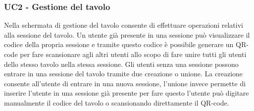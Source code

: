 \subsubsection{UC2 - Gestione del tavolo}
Nella schermata di gestione del tavolo consente di effettuare operazioni relativi alla sessione del tavolo. Un utente già presente in una sessione può visualizzare il codice della propria sessione e tramite questo codice è possibile generare un QR-code per fare scansionare agli altri utenti allo scopo di fare unire tutti gli utenti dello stesso tavolo nella stessa sessione. Gli utenti senza una sessione possono entrare in una sessione del tavolo tramite due creazione o unione. La creazione consente all'utente di entrare in una nuova sessione, l'unione invece permette di inserire l'utente in una sessione già presente per fare questo l'utente può digitare manualmente il codice del tavolo o scansionando direttamente il QR-code. 
